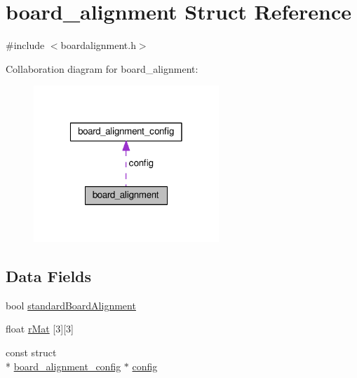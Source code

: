 \hypertarget{structboard__alignment}{\section{board\+\_\+alignment Struct Reference}
\label{structboard__alignment}
}


{\ttfamily \#include $<$boardalignment.\+h$>$}



Collaboration diagram for board\+\_\+alignment\+:\nopagebreak
\begin{figure}[H]
\begin{center}
\leavevmode
\includegraphics[width=198pt]{structboard__alignment__coll__graph}
\end{center}
\end{figure}
\subsection*{Data Fields}
\begin{DoxyCompactItemize}
\item 
bool \hyperlink{structboard__alignment_a593d82f8484e676b0dac52037e9fefc2}{standard\+Board\+Alignment}
\item 
float \hyperlink{structboard__alignment_aaac1defe86485be6a6c5a8445f3c15cb}{r\+Mat} \mbox{[}3\mbox{]}\mbox{[}3\mbox{]}
\item 
const struct \\*
\hyperlink{structboard__alignment__config}{board\+\_\+alignment\+\_\+config} $\ast$ \hyperlink{structboard__alignment_a82f9a5c77030df92a1b68c7764f85217}{config}
\end{DoxyCompactItemize}


